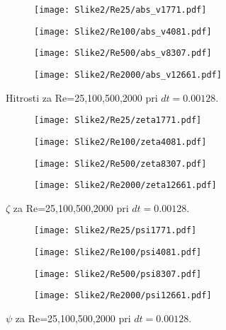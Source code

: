 \documentclass[12pt,a4paper]{article}
\begin{document}
\begin{figure}[H]
    \centering
    \begin{subfigure}[b]{0.2\textwidth}  			
        \texttt{[image: Slike2/Re25/abs\_v1771.pdf]}
    \end{subfigure}
    \begin{subfigure}[b]{0.2\textwidth}  			
        \texttt{[image: Slike2/Re100/abs\_v4081.pdf]}
    \end{subfigure}
    \begin{subfigure}[b]{0.2\textwidth}  			
        \texttt{[image: Slike2/Re500/abs\_v8307.pdf]}
    \end{subfigure}
        \begin{subfigure}[b]{0.2\textwidth}  			
        \texttt{[image: Slike2/Re2000/abs\_v12661.pdf]}
    \end{subfigure}
    \caption{Hitrosti za Re={25,100,500,2000} pri $dt=0.00128$.} \label{fig:slika11}
\end{figure}

\begin{figure}[H]
    \centering
    \begin{subfigure}[b]{0.2\textwidth}  			
        \texttt{[image: Slike2/Re25/zeta1771.pdf]}
    \end{subfigure}
    \begin{subfigure}[b]{0.2\textwidth}  			
        \texttt{[image: Slike2/Re100/zeta4081.pdf]}
    \end{subfigure}
    \begin{subfigure}[b]{0.2\textwidth}  			
        \texttt{[image: Slike2/Re500/zeta8307.pdf]}
    \end{subfigure}
        \begin{subfigure}[b]{0.2\textwidth}  			
        \texttt{[image: Slike2/Re2000/zeta12661.pdf]}
    \end{subfigure}
    \caption{$\zeta$ za Re={25,100,500,2000} pri $dt=0.00128$.} \label{fig:slika12}
\end{figure}


\begin{figure}[H]
    \centering
    \begin{subfigure}[b]{0.2\textwidth}  			
        \texttt{[image: Slike2/Re25/psi1771.pdf]}
    \end{subfigure}
    \begin{subfigure}[b]{0.2\textwidth}  			
        \texttt{[image: Slike2/Re100/psi4081.pdf]}
    \end{subfigure}
    \begin{subfigure}[b]{0.2\textwidth}  			
        \texttt{[image: Slike2/Re500/psi8307.pdf]}
    \end{subfigure}
        \begin{subfigure}[b]{0.2\textwidth}  			
        \texttt{[image: Slike2/Re2000/psi12661.pdf]}
    \end{subfigure}
    \caption{$\psi$ za Re={25,100,500,2000} pri $dt=0.00128$.} \label{fig:slika13}
\end{figure}
\end{document}
